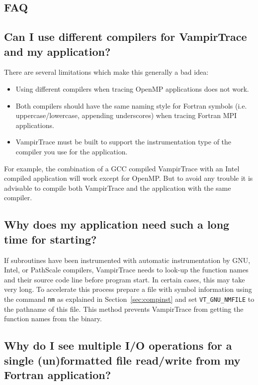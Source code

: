 \documentclass[a4paper,twoside,12pt,BCOR12mm]{scrbook}
\begin{document}
\begin{latexonly}
\chapter{FAQ}

\section{Can I use different compilers for VampirTrace and my application?}
\label{sec:faq_compiler}

There are several limitations which make this generally a bad idea:
\begin{itemize}
 \item Using different compilers when tracing OpenMP applications does not work.
 \item Both compilers should have the same naming style for Fortran symbols
       (i.e. uppercase/lowercase, appending underscores) when tracing Fortran MPI
       applications.
 \item VampirTrace must be built to support the instrumentation type of the
       compiler you use for the application.
\end{itemize}
For example, the combination of a GCC compiled VampirTrace with an Intel compiled
application will work except for OpenMP. But to avoid any trouble it is advisable
to compile both VampirTrace and the application with the same compiler.

\section{Why does my application need such a long time for starting?}
\label{sec:gnu_getsrc}

If subroutines have been instrumented with automatic instrumentation by GNU, Intel, or
PathScale compilers, VampirTrace needs to look-up the function names and their source
code line before program start. In certain cases, this may take very long.
To accelerate this process prepare a file with symbol information using the command \texttt{nm}
as explained in Section~\ref{sec:compinst} and set \texttt{VT\_GNU\_NMFILE}
to the pathname of this file. This method prevents VampirTrace from getting the
function names from the binary.

\section[Fortran file I/O is not accounted properly?]{Why do I see multiple
I/O operations for a single (un)formatted file read/write from my Fortran
application?}
\label{sec:faq_fortranio}


\end{latexonly}
\end{document}
